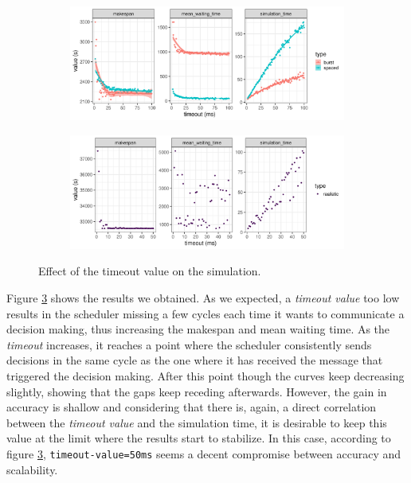 \begin{figure}
	\begin{subfigure}{\textwidth}
		\centering
		\includegraphics[width=\textwidth]{../imgs/timeout_burst_spaced.png}
		\caption{}
		\label{fig:timeout_burst_sp}
	\end{subfigure}

	\begin{subfigure}{\textwidth}
		\centering
		\includegraphics[width=\textwidth]{../imgs/timeout_realistic.png}
		\caption{}
		\label{fig:timeout_real}
	\end{subfigure}

	\caption{Effect of the timeout value on the simulation.}
	\label{fig:timeout}
\end{figure}

Figure \ref{fig:timeout} shows the results we obtained. As we expected, a
\textit{timeout value} too low results in the scheduler missing a few cycles
each time it wants to communicate a decision making, thus increasing the
makespan and mean waiting time. As the \textit{timeout} increases, it reaches a
point where the scheduler consistently sends decisions in the same cycle as the
one where it has received the message that triggered the decision making. After
this point though the curves keep decreasing slightly, showing that the gaps
keep receding afterwards. However, the gain in accuracy is shallow and
considering that there is, again, a direct correlation between the
\textit{timeout value} and the simulation time, it is desirable to keep this
value at the limit where the results start to stabilize.  In this case,
according to figure \ref{fig:timeout}, \texttt{timeout-value=50ms} seems a
decent compromise between accuracy and scalability.

